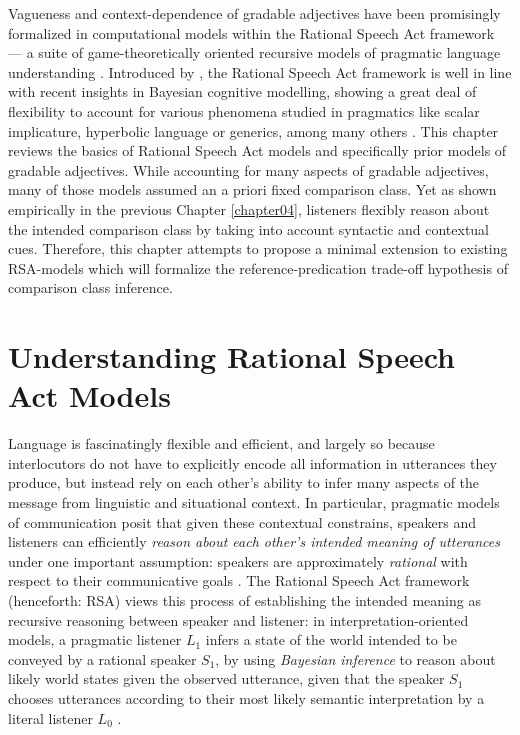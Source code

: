 Vagueness and context-dependence of gradable adjectives have been promisingly formalized in computational models within the Rational Speech Act framework ---  a suite of game-theoretically oriented recursive models of pragmatic language understanding \parencite[e.g.,][]{goodman2016, lassiter2017adjectival, tessler2017warm}. Introduced by \textcite{frank2012predicting}, the Rational Speech Act framework is well in line with recent insights in Bayesian cognitive modelling, showing a great deal of flexibility to account for various phenomena studied in pragmatics like scalar implicature, hyperbolic language or generics, among many others \parencite[e.g.,][]{tenenbaum2011grow, problang}. This chapter reviews the basics of Rational Speech Act models and specifically prior models of gradable adjectives. While accounting for many aspects of gradable adjectives, many of those models assumed an a priori fixed comparison class. Yet as shown empirically in the previous Chapter \ref{chapter04}, listeners flexibly reason about the intended comparison class by taking into account syntactic and contextual cues. Therefore, this chapter attempts to propose a minimal extension to existing RSA-models which will formalize the reference-predication trade-off hypothesis of comparison class inference.%
  
\section{Understanding Rational Speech Act Models}
\label{intro-rsa}
Language is fascinatingly flexible and efficient, and largely so because interlocutors do not have to explicitly encode all information in utterances they produce, but instead rely on each other's ability to infer many aspects of the message from linguistic and situational context. In particular, pragmatic models of communication posit that given these contextual constrains, speakers and listeners can efficiently \emph{reason about each other's intended meaning of utterances} under one important assumption: speakers are approximately \emph{rational} with respect to their communicative goals \parencite{frank2012predicting}. The Rational Speech Act framework (henceforth: RSA) views this process of establishing the intended meaning as recursive reasoning between speaker and listener: in interpretation-oriented models, a pragmatic listener $L_1$ infers a state of the world intended to be conveyed by a rational speaker $S_1$, by using \emph{Bayesian inference} to reason about likely world states given the observed utterance, given that the speaker $S_1$ chooses utterances according to their most likely semantic interpretation by a literal listener $L_0$ \parencite{problang}.  

